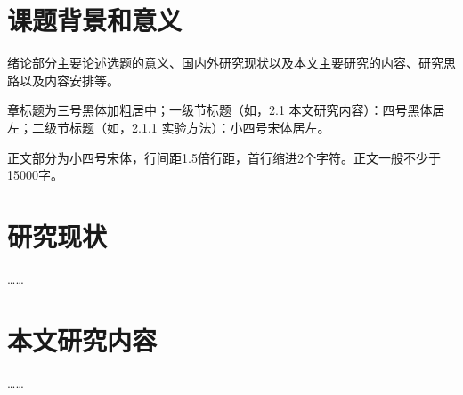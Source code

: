 \section{课题背景和意义}
  绪论部分主要论述选题的意义、国内外研究现状以及本文主要研究的内容、研究思路以及内容安排等。

  章标题为三号黑体加粗居中；一级节标题（如，2.1 本文研究内容）：四号黑体居左；二级节标题（如，2.1.1 实验方法）：小四号宋体居左。

  正文部分为小四号宋体，行间距1.5倍行距，首行缩进2个字符。正文一般不少于15000字。

\section{研究现状}
  ……

\section{本文研究内容}
  ……
